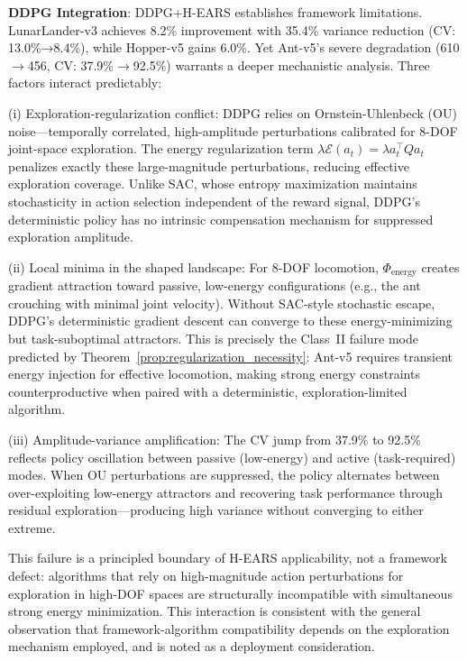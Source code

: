 \documentclass[journal]{IEEEtran}
\begin{document}
	\textbf{DDPG Integration}: DDPG+H-EARS establishes framework limitations. LunarLander-v3 achieves 8.2\% improvement with 35.4\% variance reduction (CV: 13.0\%→8.4\%), while Hopper-v5 gains 6.0\%. Yet Ant-v5's severe degradation (610$\to$456, CV: 37.9\%$\to$92.5\%) warrants a deeper mechanistic analysis. Three factors interact predictably:
	
	(i) Exploration-regularization conflict: DDPG relies on Ornstein-Uhlenbeck (OU) noise---temporally correlated, high-amplitude perturbations calibrated for 8-DOF joint-space exploration. The energy regularization term $\lambda\mathcal{E}(a_t) = \lambda a_t^\top Q a_t$ penalizes exactly these large-magnitude perturbations, reducing effective exploration coverage. Unlike SAC, whose entropy maximization maintains stochasticity in action selection independent of the reward signal, DDPG's deterministic policy has no intrinsic compensation mechanism for suppressed exploration amplitude.
	
	(ii) Local minima in the shaped landscape: For 8-DOF locomotion, $\Phi_{\text{energy}}$ creates gradient attraction toward passive, low-energy configurations (e.g., the ant crouching with minimal joint velocity). Without SAC-style stochastic escape, DDPG's deterministic gradient descent can converge to these energy-minimizing but task-suboptimal attractors. This is precisely the Class~II failure mode predicted by Theorem~\ref{prop:regularization_necessity}: Ant-v5 requires transient energy injection for effective locomotion, making strong energy constraints counterproductive when paired with a deterministic, exploration-limited algorithm.
	
	(iii) Amplitude-variance amplification: The CV jump from 37.9\% to 92.5\% reflects policy oscillation between passive (low-energy) and active (task-required) modes. When OU perturbations are suppressed, the policy alternates between over-exploiting low-energy attractors and recovering task performance through residual exploration---producing high variance without converging to either extreme.
	
	This failure is a principled boundary of H-EARS applicability, not a framework defect: algorithms that rely on high-magnitude action perturbations for exploration in high-DOF spaces are structurally incompatible with simultaneous strong energy minimization. This interaction is consistent with the general observation that framework-algorithm compatibility depends on the exploration mechanism employed, and is noted as a deployment consideration.
	
\end{document}
